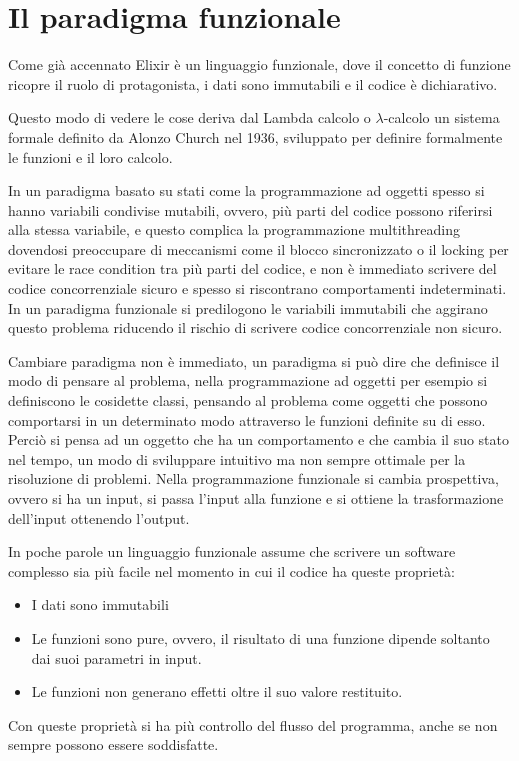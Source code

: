\section{Il paradigma funzionale}
Come già accennato Elixir è un linguaggio funzionale, dove
il concetto di funzione ricopre il ruolo di protagonista,
i dati sono immutabili e il codice è dichiarativo.

Questo modo di vedere le cose deriva dal Lambda calcolo o $\lambda$-calcolo
\cite{Lambdaca75:online}
un sistema formale definito da Alonzo Church nel 1936, sviluppato
per definire formalmente le funzioni e il loro calcolo.

In un paradigma basato su stati come la programmazione ad oggetti
spesso si hanno variabili condivise mutabili, ovvero, più parti del codice
possono riferirsi alla stessa variabile, e questo complica la programmazione
multithreading dovendosi preoccupare di meccanismi come il blocco
sincronizzato o il locking per evitare le race condition tra più parti
del codice, e non è immediato scrivere del codice concorrenziale sicuro
e spesso si riscontrano comportamenti indeterminati.
In un paradigma funzionale si predilogono le variabili immutabili che
aggirano questo problema riducendo il rischio di scrivere codice
concorrenziale non sicuro.

Cambiare paradigma non è immediato, un paradigma si può dire che
definisce il modo di pensare al problema, nella programmazione ad
oggetti per esempio si definiscono le cosidette classi,
pensando al problema come oggetti che possono comportarsi in un
determinato modo attraverso le funzioni definite su di esso.
Perciò si pensa ad un oggetto che ha un comportamento e che cambia
il suo stato nel tempo, un modo di sviluppare intuitivo ma non sempre
ottimale per la risoluzione di problemi. Nella programmazione funzionale
si cambia prospettiva, ovvero si ha un input, si passa l'input 
alla funzione e si ottiene la trasformazione dell'input ottenendo
l'output.

In poche parole un linguaggio funzionale assume che scrivere un
software complesso sia più facile nel momento in cui il codice ha
queste proprietà:
\begin{itemize}
    \item I dati sono immutabili
    \item Le funzioni sono pure, ovvero, il risultato di una funzione
    dipende soltanto dai suoi parametri in input.
    \item Le funzioni non generano effetti oltre il suo valore restituito.
\end{itemize}

Con queste proprietà si ha più controllo del flusso del programma,
anche se non sempre possono essere soddisfatte.












